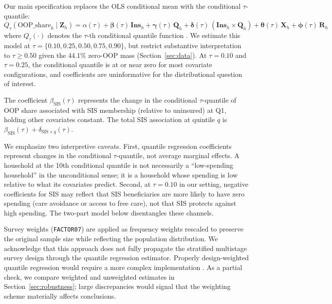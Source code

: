 Our main specification replaces the OLS conditional mean with the conditional $\tau$-quantile:
\begin{equation}\label{eq:qr}
    Q_\tau(\text{OOP\_share}_h \mid \mathbf{Z}_h) = \alpha(\tau) + \boldsymbol{\beta}(\tau) \, \mathbf{Ins}_h + \boldsymbol{\gamma}(\tau) \, \mathbf{Q}_h + \boldsymbol{\delta}(\tau) \, (\mathbf{Ins}_h \times \mathbf{Q}_h) + \boldsymbol{\theta}(\tau) \, \mathbf{X}_h + \boldsymbol{\phi}(\tau) \, \mathbf{R}_h
\end{equation}
where $Q_\tau(\cdot)$ denotes the $\tau$-th conditional quantile function \citep{Koenker1978}. We estimate this model at $\tau = \{0.10, 0.25, 0.50, 0.75, 0.90\}$, but restrict substantive interpretation to $\tau \geq 0.50$ given the 44.1\% zero-OOP mass (Section~\ref{sec:data}). At $\tau = 0.10$ and $\tau = 0.25$, the conditional quantile is at or near zero for most covariate configurations, and coefficients are uninformative for the distributional question of interest.

The coefficient $\beta_{\text{SIS}}(\tau)$ represents the change in the conditional $\tau$-quantile of OOP share associated with SIS membership (relative to uninsured) at Q1, holding other covariates constant. The total SIS association at quintile $q$ is $\beta_{\text{SIS}}(\tau) + \delta_{\text{SIS} \times q}(\tau)$.

We emphasize two interpretive caveats. First, quantile regression coefficients represent changes in the conditional $\tau$-quantile, not average marginal effects. A household at the 10th conditional quantile is not necessarily a ``low-spending household'' in the unconditional sense; it is a household whose spending is low relative to what its covariates predict. Second, at $\tau = 0.10$ in our setting, negative coefficients for SIS may reflect that SIS beneficiaries are more likely to have zero spending (care avoidance or access to free care), not that SIS protects against high spending. The two-part model below disentangles these channels.

Survey weights (\texttt{FACTOR07}) are applied as frequency weights rescaled to preserve the original sample size while reflecting the population distribution. We acknowledge that this approach does not fully propagate the stratified multistage survey design through the quantile regression estimator. Properly design-weighted quantile regression would require a more complex implementation \citep{Koenker2005}. As a partial check, we compare weighted and unweighted estimates in Section~\ref{sec:robustness}; large discrepancies would signal that the weighting scheme materially affects conclusions.

